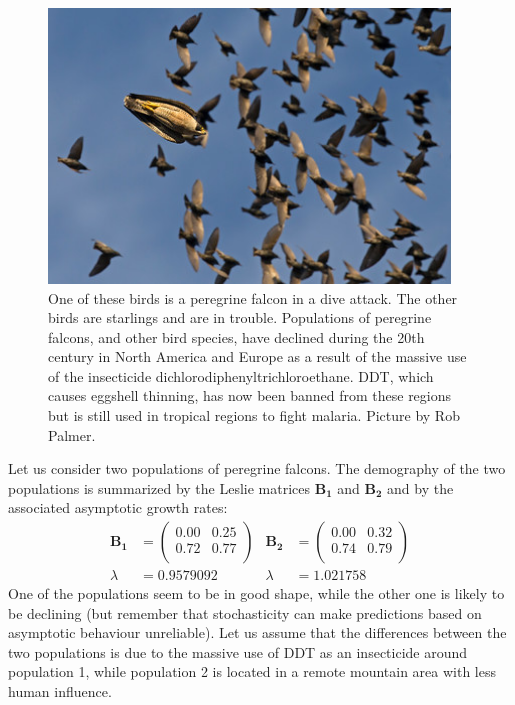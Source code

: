\documentclass{article}\usepackage[]{graphicx}\usepackage[]{color}
\begin{document}
\begin{figure}
\includegraphics[width=0.95\textwidth]{peregrine}
\caption{\label{fig:peregrine}One of these birds is a peregrine falcon in a dive attack. The other birds are starlings and are in trouble. Populations of peregrine falcons, and other bird species, have declined during the 20th century in North America and Europe as a result of the massive use of the insecticide dichlorodiphenyltrichloroethane. DDT, which causes eggshell thinning, has now been banned from these regions but is still used in tropical regions to fight malaria. Picture by Rob Palmer.}
\end{figure}

Let us consider two populations of peregrine falcons. 
The demography of the two populations is summarized by the Leslie matrices $\boldsymbol{B_1}$ and $\boldsymbol{B_2}$ and by the associated asymptotic growth rates:
\begin{align*}\boldsymbol{B_1} &=%
\begin{pmatrix}{}
  0.00 & 0.25 \\ 
  0.72 & 0.77 \\ 
  \end{pmatrix}
& \boldsymbol{B_2} &=%
\begin{pmatrix}{}
  0.00 & 0.32 \\ 
  0.74 & 0.79 \\ 
  \end{pmatrix}
\\ \lambda &= 0.9579092 &\lambda &= 1.021758\end{align*}
One of the populations seem to be in good shape, while the other one is likely to be declining (but remember that stochasticity can make predictions based on asymptotic behaviour unreliable). Let us assume that the differences between the two populations is due to the massive use of DDT as an insecticide around population 1, while population 2 is located in a remote mountain area with less human influence.
\end{document}

